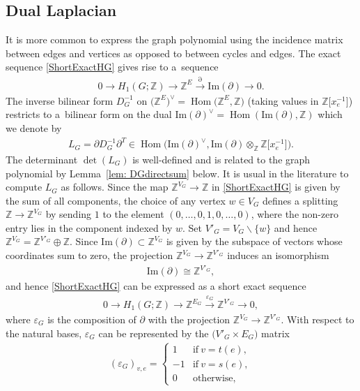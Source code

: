 \documentclass[pdftex]{sigma}%
\numberwithin{equation}{section}
\newcommand{\To}{\longrightarrow}
\newcommand{\Z}{\mathbb Z}
\newcommand{\0}{\color{blue}{\mathsf{0}}}
\begin{document}
\subsection{Dual Laplacian} It is more common to express the graph polynomial using the incidence matrix between edges and vertices as opposed to between cycles and edges. The exact sequence \eqref{ShortExactHG} gives rise to a~sequence
\begin{gather} \label{SEHGv2}
0 \To H_1(G;\Z) \To \Z^{E}\overset{\partial}{\To} \mathrm{Im}(\partial) \To 0.
\end{gather}
The inverse bilinear form $D_G^{-1}$ on $\big(\Z^E\big)^{\vee}=\operatorname{Hom}\big(\Z^E,\Z\big)$ \big(taking values in $\Z\big[x_e^{-1}\big]$\big) restricts to a~bilinear form on the dual $\mathrm{Im}(\partial)^{\vee}= \operatorname{Hom} (\mathrm{Im}(\partial), \Z)$ which we denote by
\begin{gather*} %
L_G = \partial D_G^{-1} \partial^{T} \in \operatorname{Hom} \big( \mathrm{Im}(\partial)^{\vee}, \mathrm{Im}(\partial) \otimes_{\Z} \Z\big[x_e^{-1}\big]\big) .
\end{gather*}
The determinant $\det(L_G)$ is well-defined and is related to the graph polynomial by Lemma~\ref{lem: DGdirectsum} below.
It is usual in the literature to compute $L_G$ as follows.
Since the map $\Z^{V_G} \rightarrow \Z$ in \eqref{ShortExactHG} is given by the sum of all components, the choice of any vertex $w \in V_G$ defines a splitting $ \Z \rightarrow \Z^{V_G}$ by sending $1$ to the element $(0,\dots, 0,1,0,\dots ,0)$, where the non-zero entry lies in the component indexed by $w$.
Set $V'_G = V_G \backslash \{w\}$ and hence $\Z^{V_G}= \Z^{V'_G} \oplus \Z$.
Since $\mathrm{Im}(\partial) \subset \Z^{V_G}$ is given by the subspace of vectors whose coordinates sum to zero,
 the projection $ \Z^{V_G}\rightarrow \Z^{V'_G}$ induces an isomorphism
\begin{gather*}
 \mathrm{Im}(\partial) \cong \Z^{V'_G},
 \end{gather*}
and hence \eqref{ShortExactHG} can be expressed as a short exact sequence
\begin{gather} \label{reducedShortExact}
0 \To H_1(G; \Z) \To \Z^{E_G} \overset{\varepsilon_G}{\To} \Z^{V'_G}\To 0,
\end{gather}
where $\varepsilon_G$ is the composition of $\partial$ with the projection $ \Z^{V_G}\rightarrow \Z^{V'_G}$. With respect to the natural bases, $\varepsilon_G$ can be represented by the $\big(V'_G\times E_G\big)$ matrix
\begin{gather*}
(\varepsilon_G)_{v,e} = \begin{cases}
1 &\text{if} \ v=t(e), \\
-1 &\text{if} \ v=s(e), \\
0 &\text{otherwise},
 \end{cases}
 \end{gather*}
\end{document}
